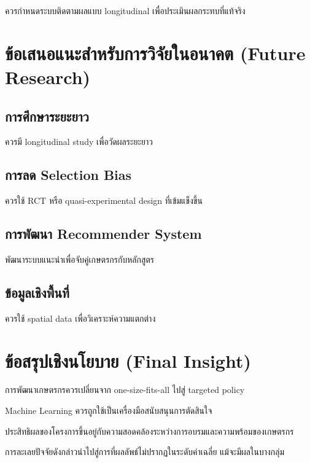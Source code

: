 ควรกำหนดระบบติดตามผลแบบ longitudinal เพื่อประเมินผลกระทบที่แท้จริง

\section{ข้อเสนอแนะสำหรับการวิจัยในอนาคต (Future Research)}

\subsection{การศึกษาระยะยาว}
ควรมี longitudinal study เพื่อวัดผลระยะยาว

\subsection{การลด Selection Bias}
ควรใช้ RCT หรือ quasi-experimental design ที่เข้มแข็งขึ้น

\subsection{การพัฒนา Recommender System}
พัฒนาระบบแนะนำเพื่อจับคู่เกษตรกรกับหลักสูตร

\subsection{ข้อมูลเชิงพื้นที่}
ควรใช้ spatial data เพื่อวิเคราะห์ความแตกต่าง

\section{ข้อสรุปเชิงนโยบาย (Final Insight)}

การพัฒนาเกษตรกรควรเปลี่ยนจาก one-size-fits-all ไปสู่ targeted policy

Machine Learning ควรถูกใช้เป็นเครื่องมือสนับสนุนการตัดสินใจ

ประสิทธิผลของโครงการขึ้นอยู่กับความสอดคล้องระหว่างการอบรมและความพร้อมของเกษตรกร

การละเลยปัจจัยดังกล่าวนำไปสู่การที่ผลลัพธ์ไม่ปรากฏในระดับค่าเฉลี่ย แม้จะมีผลในบางกลุ่ม